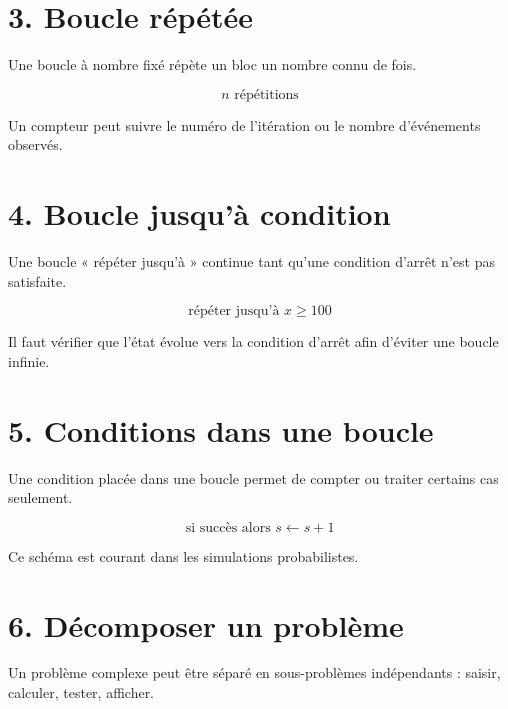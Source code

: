 
\section{3. Boucle répétée}
Une boucle à nombre fixé répète un bloc un nombre connu de fois.

\[
n\text{ répétitions}
\]

\begin{exemple}
Un compteur peut suivre le numéro de l’itération ou le nombre d’événements observés.
\end{exemple}

\section{4. Boucle jusqu’à condition}
Une boucle « répéter jusqu’à » continue tant qu’une condition d’arrêt n’est pas satisfaite.

\[
\text{répéter jusqu’à }x\ge100
\]

\begin{exemple}
Il faut vérifier que l’état évolue vers la condition d’arrêt afin d’éviter une boucle infinie.
\end{exemple}

\section{5. Conditions dans une boucle}
Une condition placée dans une boucle permet de compter ou traiter certains cas seulement.

\[
\text{si succès alors }s\leftarrow s+1
\]

\begin{exemple}
Ce schéma est courant dans les simulations probabilistes.
\end{exemple}


\section{6. Décomposer un problème}
Un problème complexe peut être séparé en sous-problèmes indépendants : saisir, calculer, tester, afficher.

